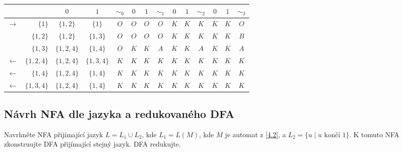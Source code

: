 \begin{center}
    \begin{tabular}{|r r|c c||c|c c||c|c c||c|c c|| c |}
        \hline
        & & $ 0 $ & $ 1 $ & $ \sim_0 $ & $ 0 $ & $ 1 $ & $ \sim_1 $ & $ 0 $ & $ 1 $ & $ \sim_2 $ & $ 0 $ & $ 1 $ & $\sim_3$ \\ \hline \hline
        $\to$ & $\{1\}$ & $\{1,2\}$ & $\{1\}$ & $O$ & $O$ & $O$ & $O$ & $K$ & $K$ & $K$ & $K$ & $K$ & $O$\\
        & $\{1,2\}$& $\{1, 2\}$ & $\{1, 3\}$ & $O$ & $O$ & $O$ & $O$ & $K$ & $K$ & $K$ & $K$ & $K$ & $B$ \\
        & $\{1,3\}$& $\{1, 2, 4\}$ & $\{1,4\}$ & $O$ & $K$ & $K$ & $A$ & $K$ & $K$ & $A$ & $K$ & $K$ & $A$ \\
        $\gets$ & $\{1,2,4\}$& $\{1, 2, 4\}$ & $\{1, 3, 4\}$ & $K$ & $K$ & $K$ & $K$ & $K$ & $K$ & $K$ & $K$ & $K$ & $K$\\
        $\gets$ & $\{1,4\}$ & $\{1,2, 4\}$ & $\{1, 4\}$ & $K$ & $K$ & $K$ & $K$ & $K$ & $K$ & $K$ & $K$ & $K$ & $K$ \\
        $\gets$ & $\{1, 3, 4\}$& $\{1, 2, 4\}$ & $\{1, 4\}$ & $K$ & $K$ & $K$ & $K$ & $K$ & $K$ & $K$ & $K$ & $K$ & $K$ \\
        \hline
    \end{tabular}

\medskip


\end{center}

\subsection{Návrh NFA dle jazyka a redukovaného DFA}
Navrhněte NFA přijímající jazyk $L= L_1 \cup L_2$, kde $L_1 = L(M)$, kde $M$ je automat z \ref{4.2}, a
${L_2 = \{u \mid u \text{ končí } 1\}}$. K tomuto NFA zkonstruujte DFA přijímající stejný jazyk. DFA redukujte.

